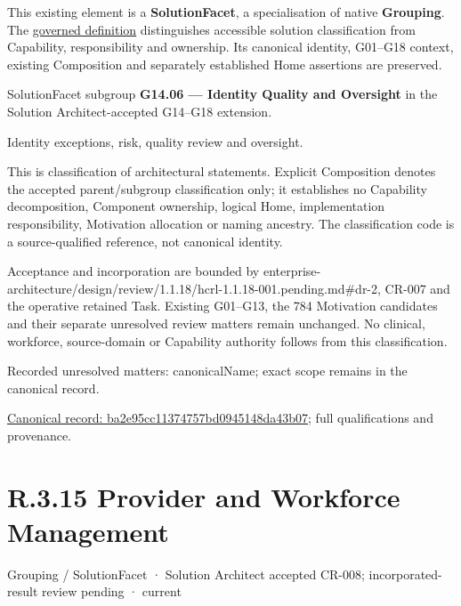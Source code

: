 This existing element is a \textbf{SolutionFacet}, a specialisation of native
\textbf{Grouping}. The \href{\detokenize{../../../../../../../governance/continuum-representation.md#solutionfacet-classification--1119-candidate}}{governed definition}
distinguishes accessible solution classification from Capability, responsibility
and ownership. Its canonical identity, G01–G18 context, existing Composition
and separately established Home assertions are preserved.



SolutionFacet subgroup \textbf{G14.06 — Identity Quality and Oversight} in the Solution Architect-accepted G14–G18 extension.



Identity exceptions, risk, quality review and oversight.



This is classification of architectural statements. Explicit Composition denotes the accepted parent/subgroup classification only; it establishes no Capability decomposition, Component ownership, logical Home, implementation responsibility, Motivation allocation or naming ancestry. The classification code is a source-qualified reference, not canonical identity.



Acceptance and incorporation are bounded by enterprise-architecture/design/review/1.1.18/hcrl-1.1.18-001.pending.md\#dr-2, CR-007 and the operative retained Task. Existing G01–G13, the 784 Motivation candidates and their separate unresolved review matters remain unchanged. No clinical, workforce, source-domain or Capability authority follows from this classification.


{\small Recorded unresolved matters: canonicalName; exact scope remains in the canonical record.}\par
{\footnotesize \href{../../../../../../../continuum/grouping/ba2e95cc11374757bd0945148da43b07.md}{Canonical record: ba2e95cc11374757bd0945148da43b07}; full qualifications and provenance.}\par
\section*{R.3.15 Provider and Workforce Management}
\label{navigation:R.3.15}

\label{element:fd9d0fa7117a4dc3b45cfed0e7be614b}
{\small Grouping / SolutionFacet · Solution Architect accepted CR-008; incorporated-result review pending · current}\par

